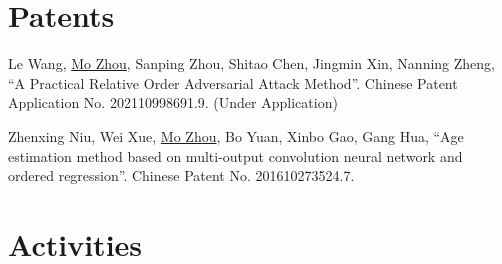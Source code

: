 \documentclass[10pt,margin,line,pifont,palatino,courier]{res}
\begin{document}
\begin{resume}
\section{\sc Patents}

\begin{enumerate}[noitemsep, leftmargin=*, label={[P0{\arabic*}]}]

\item Le Wang, \underline{Mo Zhou}, Sanping Zhou, Shitao Chen, Jingmin Xin, Nanning Zheng,
	``A Practical Relative Order Adversarial Attack Method''.
	Chinese Patent Application No. 202110998691.9. (Under Application)

\item Zhenxing Niu, Wei Xue, \underline{Mo Zhou}, Bo Yuan, Xinbo Gao, Gang Hua,
	``Age estimation method based on multi-output convolution neural
	network and ordered regression''. Chinese Patent No. 201610273524.7.

\end{enumerate}

\section{\sc Activities}


\end{resume}
\end{document}
